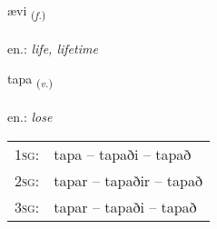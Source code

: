 \documentclass[frontgrid, backgrid]{flacards}\usepackage[]{graphicx}\usepackage[]{xcolor}
\begin{document}
\renewcommand{\flhead}{\vskip5pt \fboxsep=0pt {\small\bfseries\footnotesize Nafnorð | Noun}}
\renewcommand{\fcfoot}{\vskip5pt \fboxsep=0pt \hspace{2pt}{\small\bfseries\footnotesize 2K}}

\renewcommand{\blhead}{\vskip5pt {\small\bfseries\footnotesize Nafnorð | Noun }}
\renewcommand{\bcfoot}{\vskip5pt \hspace{2pt}{\small\bfseries\footnotesize 2K}}


{ævi \small{\textsubscript{(\textit{f.})}} \\[1ex] %
\textphonetic{[aiːvɪ]} \\
en.: \emph{life, lifetime} \\  [2ex]
\renewcommand*{\arraystretch}{0.8}
}

\renewcommand{\flhead}{\vskip5pt \fboxsep=0pt {\small\bfseries\footnotesize Sagnorð | Verb}}
\renewcommand{\fcfoot}{\vskip5pt \fboxsep=0pt \hspace{2pt}{\small\bfseries\footnotesize 2K}}

\renewcommand{\blhead}{\vskip5pt {\small\bfseries\footnotesize Sagnorð | Verb }}
\renewcommand{\bcfoot}{\vskip5pt \hspace{2pt}{\small\bfseries\footnotesize 2K}}


{tapa \small{\textsubscript{(\textit{v.})}} \\[1ex] %
\textphonetic{[tʰaːpa]} \\
en.: \emph{lose} \\  [2ex]
\renewcommand*{\arraystretch}{0.8}
\begin{tabular}{p{1cm}l}
\textsc{1sg}: & tapa -- tapaði -- tapað \\ 
\textsc{2sg}: & tapar -- tapaðir -- tapað \\ 
\textsc{3sg}: & tapar -- tapaði -- tapað \\ 
\end{tabular}
}
\end{document}
